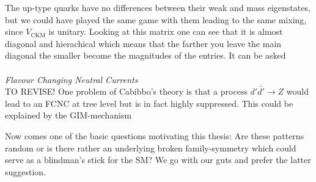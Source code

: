 The up-type quarks have no differences between their weak and mass eigenstates, but we could have played the same game with them leading to the 
same mixing, since $V_\text{CKM}$ is unitary. Looking at this matrix one can see that it is almost diagonal and hierachical which
means that the farther you leave the main diagonal the smaller become the magnitudes of the entries. It can be asked 
\\ \\ \textit{Flavour Changing Neutral Currents}\\
\noindent TO REVISE!
One problem of Cabibbo's theory is that a process $d'\bar {d'} \rightarrow Z$ would lead to an FCNC at tree level but is in fact highly suppressed. This
could be explained by the GIM-mechanism 


Now comes one of the basic questions motivating this thesis: Are these patterns random or is there rather an underlying broken family-symmetry which
could serve as a blindman's stick for the SM? We go with our guts and prefer the latter suggestion.
